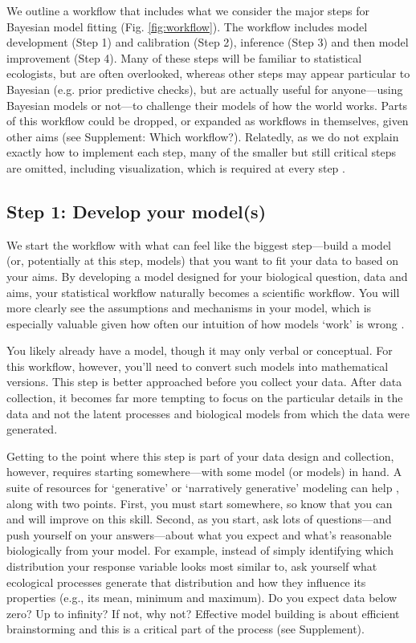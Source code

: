 \documentclass[11pt]{article}
\begin{document}
We outline a workflow that includes what we consider the major steps for Bayesian model fitting (Fig. \ref{fig:workflow}). The workflow includes model development (Step 1) and calibration (Step 2), inference (Step 3) and then model improvement (Step 4). Many of these steps will be familiar to statistical ecologists, but are often overlooked, whereas other steps may appear particular to Bayesian (e.g. prior predictive checks), but are actually useful for anyone---using Bayesian models or not---to challenge their models of how the world works. Parts of this workflow could be dropped, or expanded as workflows in themselves, given other aims (see Supplement: Which workflow?). Relatedly, as we do not explain exactly how to implement each step, many of the smaller but still critical steps are omitted, including visualization, which is required at every step \citep[and for which there are many good resources, e.g.][]{gabryvis}. 

\subsection*{Step 1: Develop your model(s)} 

We start the workflow with what can feel like the biggest step---build a model (or, potentially at this step, models) that you want to fit your data to based on your aims. By developing a model designed for your biological question, data and aims, your statistical workflow naturally becomes a scientific workflow. You will more clearly see the assumptions and mechanisms in your model, which is especially valuable given how often our intuition of how models `work' is wrong \citep{kokko2005useful}.  

You likely already have a model, though it may only verbal or conceptual. For this workflow, however, you’ll need to convert such models into mathematical versions. This step is better approached before you collect your data. After data collection, it becomes far more tempting to focus on the particular details in the data and not the latent processes and biological models from which the data were generated. 

Getting to the point where this step is part of your data design and collection, however, requires starting somewhere---with some model (or models) in hand. A suite of resources for `generative' or `narratively generative' modeling can help \citep{statrethink,betangen}, along with two points. First, you must start somewhere, so know that you can and will improve on this skill. Second, as you start, ask lots of questions---and push yourself on your answers---about what you expect and what's reasonable biologically from your model. For example, instead of simply identifying which distribution your response variable looks most similar to, ask yourself what ecological processes generate that distribution and how they influence its properties (e.g., its mean, minimum and maximum). Do you expect data below zero? Up to infinity? If not, why not? Effective model building is about efficient brainstorming and this is a critical part of the process (see Supplement). 
\end{document}
